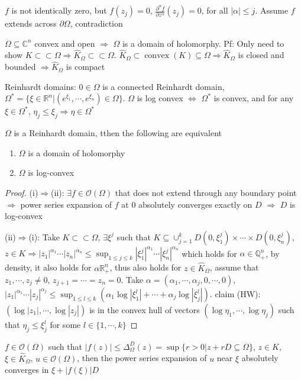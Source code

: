 \documentclass[../main.tex]{subfiles}
\begin{document}
\begin{exercise}
$f$ is not identically zero, but $f(z_j)=0$, $\frac{\partial^\alpha f}{\partial z^\alpha}(z_j)=0$, for all $|\alpha|\leq j$. Assume $f$ extends across $\partial\Omega$, contradiction
\end{exercise}

\begin{example}
$\Omega\subseteq\mathbb C^n$ convex and open $\Rightarrow$ $\Omega$ is a domain of holomorphy. Pf: Only need to show $K\subset\subset\Omega\Rightarrow\hat K_\Omega\subset\subset\Omega$. $\hat K_\Omega\subset\operatorname{convex}(K)\subseteq\Omega\Rightarrow\hat K_\Omega$ is closed and bounded $\Rightarrow\hat K_\Omega$ is compact \par
Reinhardt domains: $0\in\Omega$ is a connected Reinhardt domain, $\Omega^*=\{\xi\in\mathbb R^n|(e^{\xi_1},\cdots,e^{\xi_n})\in\Omega\}$. $\Omega$ is log convex $\Leftrightarrow$ $\Omega^*$ is convex, and for any $\xi\in\Omega^*$, $\eta_j\leq \xi_j\Rightarrow\eta\in\Omega^*$
\end{example}

\begin{theorem}
$\Omega$ is a Reinhardt domain, tthen the following are equivalent
\begin{enumerate}[label=(\roman*)]
\item $\Omega$ is a domain of holomorphy
\item $\Omega$ is log-convex
\end{enumerate}
\end{theorem}

\begin{proof}
(i)$\Rightarrow$(ii): $\exists f\in\mathcal O(\Omega)$ that does not extend through any boundary point $\Rightarrow$ power series expansion of $f$ at $0$ absolutely converges exactly on $D$ $\Rightarrow$ $D$ is log-convex \par
(ii)$\Rightarrow$(i): Take $K\subset\subset\Omega$, $\exists\xi^j$ such that $K\subseteq\cup_{j=1}^kD(0,\xi^j_1)\times\cdots\times D(0,\xi^j_n)$, $z\in K\Rightarrow |z_1|^{\alpha_1}\cdots|z_n|^{\alpha_n}\leq\sup_{1\leq j\leq k}|\xi_1^j|^{\alpha_1}\cdots|\xi^j_n|^{\alpha_n}$ which holds for $\alpha\in\mathbb Q_+^n$, by density, it also holds for $\alpha\mathbb R^n_+$, thus also holds for $z\in\hat K_\Omega$, assume that $z_1,\cdots,z_j\neq0$, $z_{j+1}=\cdots=z_n=0$. Take $\alpha=(\alpha_1,\cdots,\alpha_j,0,\cdots,0)$, $|z_1|^{\alpha_1}\cdots|z_j|^{\alpha_j}\leq\sup_{1\leq l\leq k}(\alpha_1\log|\xi^l_1|+\cdots+\alpha_j\log|\xi^l_j|)$. claim (HW): $(\log|z_1|,\cdots,\log|z_j|)$ is in the convex hull of vectors $(\log\eta_1,\cdots,\log\eta_j)$ such that $\eta_j\leq\xi^l_j$ for some $l\in\{1,\cdots,k\}$
\end{proof}

\begin{lemma}
$f\in\mathcal O(\Omega)$ such that $|f(z)|\leq\Delta^D_\Omega(z)=\sup\{r>0|z+rD\subseteq\Omega\}$, $z\in K$, $\xi\in \hat K_\Omega$, $u\in\mathcal O(\Omega)$, then the power series expansion of $u$ near $\xi$ absolutely converges in $\xi+|f(\xi)|D$
\end{lemma}
\end{document}

